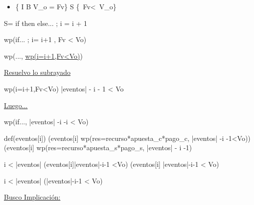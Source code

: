 \begin{itemize}
    \item\{{ I \wedge  B \wedge  V_o =  Fv\} S \{\ Fv<\ V_o\}
    }
\end{itemize}
\vspace{0.3cm}

S= if then else... ; i = i + 1

\vspace{0.3cm}

\equiv  wp(if... ; i= i+1 , Fv < Vo)

\vspace{0.3cm}

\equiv wp(..., \underline{wp(i=i+1,Fv<Vo)})  

\vspace{0.3cm}

\underline{Resuelvo lo subrayado}

\vspace{0.3cm}

 \equiv wp(i=i+1,Fv<Vo) \equiv |eventos| - i - 1 < Vo

\vspace{0.3cm}

\underline{Luego...}

\vspace{0.3cm}


\equiv wp(if..., |eventos| -i -i < Vo)

\vspace{0.3cm}

\vspace{0.3cm}

\equiv def(eventos[i]) \yLuego (eventos[i] \wedge wp(res=recurso*apuesta_c*pago_c, |eventos| -i -1<Vo))\\
\phantom{.} \hspace{15} \vee (\neg eventos[i] \wedge wp(res=recurso*apuesta_s*pago_s, |eventos| - i -1)

\vspace{0.3cm}

 \leq i < |eventos| \yLuego (eventos[i]\wedge |eventos|-i-1 <Vo) \vee (\neg eventos[i] \wedge |eventos|-i-1 < Vo)

\vspace{0.3cm}

\leq i < |eventos| \yLuego (|eventos|-i-1 < Vo)

\vspace{0.8cm}

 \underline{Busco Implicaci\'on:}

